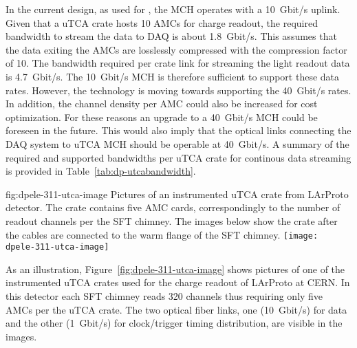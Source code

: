 In the current design, as used for , the MCH operates with a \SI{10}{Gbit/s} uplink. Given that a uTCA crate hosts \num{10} AMCs for charge readout, the required bandwidth to stream the data to DAQ is about \SI{1.8}{Gbit/s}. This assumes that the data exiting the AMCs are losslessly compressed with the compression factor of \num{10}. The bandwidth required per crate link for streaming the light readout data is \SI{4.7}{Gbit/s}. The \SI{10}{Gbit/s} MCH is therefore sufficient to support these data rates. However, the technology is moving towards supporting the \SI{40}{Gbit/s} rates. In addition, the channel density per AMC could also be increased for cost optimization. For these reasons an upgrade to a \SI{40}{Gbit/s} MCH could be foreseen in the future. This would also imply that the optical links connecting the DAQ system to uTCA MCH should be operable at \SI{40}{Gbit/s}. A summary of the required and supported bandwidths per uTCA crate for continous data streaming is provided in Table~\ref{tab:dp-utcabandwidth}.

\begin{dunefigure}{fig:dpele-311-utca-image}
{Pictures of an instrumented uTCA crate from LArProto detector. The crate contains five AMC cards, correspondingly to the number of readout channels per the SFT chimney. The images below show the crate after the  cables are connected to the warm flange of the SFT chimney.}
\texttt{[image: dpele-311-utca-image]}
\end{dunefigure}

As an illustration, Figure~\ref{fig:dpele-311-utca-image} shows pictures of one of the instrumented uTCA crates used for the charge readout of LArProto at CERN. In this detector each SFT chimney reads \num{320} channels thus requiring only five AMCs per the uTCA crate. The two optical fiber links, one (\SI{10}{Gbit/s}) for data and the other (\SI{1}{Gbit/s}) for clock/trigger timing distribution, are visible in the images.       

